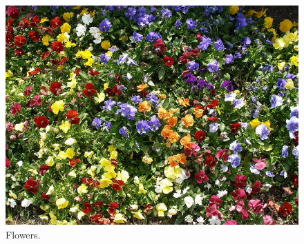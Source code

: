 \begin{refsection}
  \begin{figure}[h!]
    \centering
    \includegraphics[scale=0.05]{tikz_img/flowers.jpg}
    \caption{Flowers. \cite{turner06:_flower}}
    \label{fig:flowers}
  \end{figure}

  \FloatBarrier

  \printbibliography[heading=subbibliography]

\end{refsection}